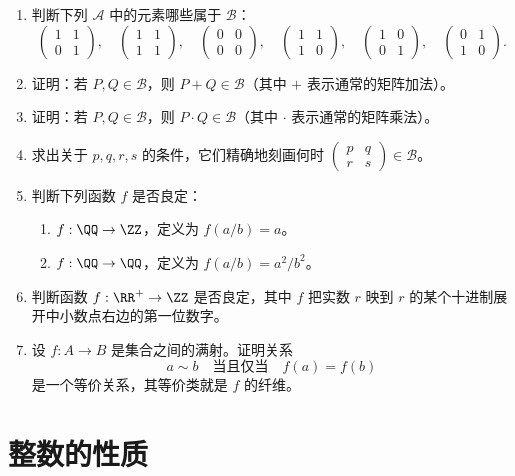 \begin{enumerate}[label=\arabic*.]
  \item 判断下列 $\mathcal{A}$ 中的元素哪些属于 $\mathcal{B}$：
  \[
  \begin{pmatrix}1&1\\0&1\end{pmatrix},\quad
  \begin{pmatrix}1&1\\1&1\end{pmatrix},\quad
  \begin{pmatrix}0&0\\0&0\end{pmatrix},\quad
  \begin{pmatrix}1&1\\1&0\end{pmatrix},\quad
  \begin{pmatrix}1&0\\0&1\end{pmatrix},\quad
  \begin{pmatrix}0&1\\1&0\end{pmatrix}.
  \]
  \item 证明：若 $P,Q\in\mathcal{B}$，则 $P+Q\in\mathcal{B}$（其中 $+$ 表示通常的矩阵加法）。
  \item 证明：若 $P,Q\in\mathcal{B}$，则 $P\cdot Q\in\mathcal{B}$（其中 $\cdot$ 表示通常的矩阵乘法）。
  \item 求出关于 $p,q,r,s$ 的条件，它们精确地刻画何时 $\begin{pmatrix}p&q\\ r&s\end{pmatrix}\in\mathcal{B}$。
  \item 判断下列函数 $f$ 是否良定：
  \begin{enumerate}[label=(\alph*)]
    \item $f:\QQ\to\ZZ$，定义为 $f(a/b)=a$。
    \item $f:\QQ\to\QQ$，定义为 $f(a/b)=a^2/b^2$。
  \end{enumerate}
  \item 判断函数 $f:\RR^+\to\ZZ$ 是否良定，其中 $f$ 把实数 $r$ 映到 $r$ 的某个十进制展开中小数点右边的第一位数字。
  \item 设 $f:A\to B$ 是集合之间的满射。证明关系
  \[
    a\sim b\quad\text{当且仅当}\quad f(a)=f(b)
  \]
  是一个等价关系，其等价类就是 $f$ 的纤维。
\end{enumerate}

\section{整数的性质}

